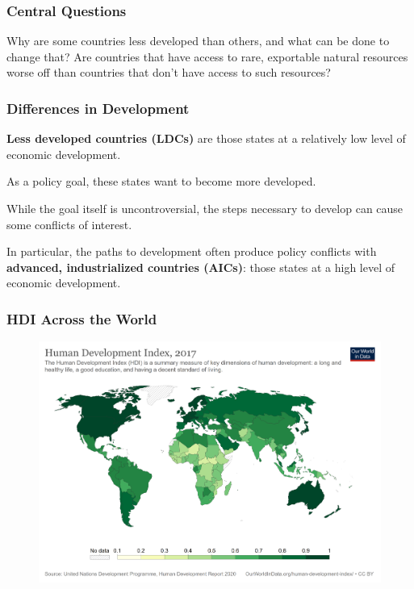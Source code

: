 \documentclass{beamer}
\begin{document}
\begin{frame} 
\frametitle{\LARGE{Central Questions}}
\centering
\large{Why are some countries less developed than others, and what can be done to change that? Are countries that have access to rare, exportable natural resources worse off than countries that don't have access to such resources?}
\end{frame}


\begin{frame} 
\frametitle{\LARGE{Differences in Development}}
\begin{itemize}
	\large{
		\item \textbf{Less developed countries (LDCs)} are those states at a relatively low level of economic development. \pause
		\item As a policy goal, these states want to become more developed. \pause
		\item While the goal itself is uncontroversial, the steps necessary to develop can cause some conflicts of interest. \pause
		\item In particular, the paths to development often produce policy conflicts with \textbf{advanced, industrialized countries (AICs)}: those states at a high level of economic development.
	}
\end{itemize}
\end{frame}

\begin{frame} 
	\frametitle{\LARGE{HDI Across the World}}
	\begin{figure}[ht!]
		\centering
		\includegraphics[height=\textheight, keepaspectratio]{./hdi.png}
	\end{figure}
\end{frame}
\end{document}
